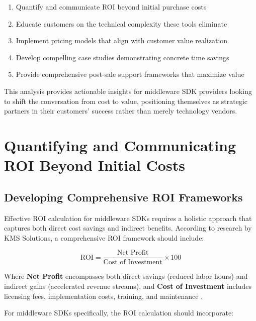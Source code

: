 \documentclass[11pt,a4paper]{article}
\begin{document}
\begin{enumerate}
    \item Quantify and communicate ROI beyond initial purchase costs
    \item Educate customers on the technical complexity these tools eliminate
    \item Implement pricing models that align with customer value realization
    \item Develop compelling case studies demonstrating concrete time savings
    \item Provide comprehensive post-sale support frameworks that maximize value
\end{enumerate}

This analysis provides actionable insights for middleware SDK providers looking to shift the conversation from cost to value, positioning themselves as strategic partners in their customers' success rather than merely technology vendors.

\section{Quantifying and Communicating ROI Beyond Initial Costs}

\subsection{Developing Comprehensive ROI Frameworks}

Effective ROI calculation for middleware SDKs requires a holistic approach that captures both direct cost savings and indirect benefits. According to research by KMS Solutions, a comprehensive ROI framework should include:

\begin{equation}
\text{ROI} = \frac{\text{Net Profit}}{\text{Cost of Investment}} \times 100
\end{equation}

Where \textbf{Net Profit} encompasses both direct savings (reduced labor hours) and indirect gains (accelerated revenue streams), and \textbf{Cost of Investment} includes licensing fees, implementation costs, training, and maintenance \citep{kms2025measure}.

For middleware SDKs specifically, the ROI calculation should incorporate:
\end{document}
